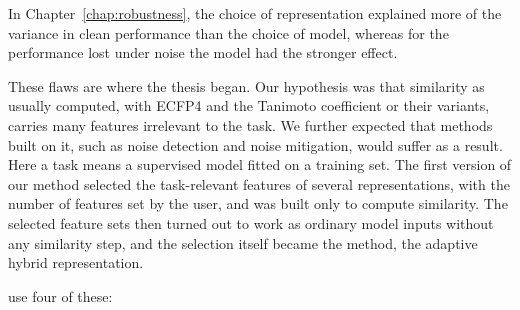 In Chapter~\ref{chap:robustness}, the choice of representation explained more of the variance in clean performance than the choice of model, whereas for the performance lost under noise the model had the stronger effect.

These flaws are where the thesis began. Our hypothesis was that similarity as usually computed, with ECFP4 and the Tanimoto coefficient or their variants, carries many features irrelevant to the task. We further expected that methods built on it, such as noise detection and noise mitigation, would suffer as a result. Here a task means a supervised model fitted on a training set. The first version of our method selected the task-relevant features of several representations, with the number of features set by the user, and was built only to compute similarity. The selected feature sets then turned out to work as ordinary model inputs without any similarity step, and the selection itself became the method, the adaptive hybrid representation.

use four of these:
